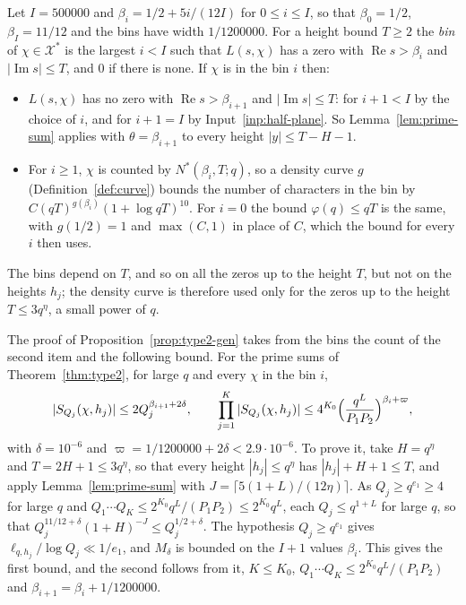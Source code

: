 \documentclass[11pt]{article}
\theoremstyle{definition}
\begin{document}
Let $I = 500000$ and $\beta_i = 1/2 + 5i/(12I)$ for $0 \le i \le I$, so that $\beta_0 = 1/2$, $\beta_I = 11/12$ and
the bins have width $1/1200000$. For a height bound $T \ge 2$ the \emph{bin} of $\chi \in \mathcal X^*$ is the largest
$i < I$ such that $L(s, \chi)$ has a zero with $\operatorname{Re} s > \beta_i$ and $|\operatorname{Im} s| \le T$, and
$0$ if there is none. If $\chi$ is in the bin $i$ then:
\begin{itemize}
\item $L(s, \chi)$ has no zero with $\operatorname{Re} s > \beta_{i+1}$ and $|\operatorname{Im} s| \le T$: for
  $i + 1 < I$ by the choice of $i$, and for $i + 1 = I$ by Input~\ref{inp:half-plane}. So
  Lemma~\ref{lem:prime-sum} applies with $\theta = \beta_{i+1}$ to every height $|y| \le T - H - 1$.
\item For $i \ge 1$, $\chi$ is counted by $N^*(\beta_i, T; q)$, so a density curve $g$ (Definition~\ref{def:curve})
bounds the number of characters
  in the bin by $C(qT)^{g(\beta_i)}(1 + \log qT)^{10}$. For $i = 0$ the bound $\varphi(q) \le qT$ is the same, with
  $g(1/2) = 1$ and $\max(C, 1)$ in place of $C$, which the bound for every $i$ then uses.
\end{itemize}
The bins depend on $T$, and so on all the zeros up to the height $T$, but not on the heights $h_j$; the density curve is
therefore used only for the zeros up to the height $T \le 3q^\eta$, a small power of $q$.

The proof of Proposition~\ref{prop:type2-gen} takes from the bins the count of the second item and the following
bound. For the prime sums of Theorem~\ref{thm:type2}, for large $q$ and every $\chi$ in the bin $i$,
\[
  |S_{Q_j}(\chi, h_j)| \le 2 Q_j^{\beta_{i+1} + 2\delta}, \qquad
  \prod_{j=1}^K |S_{Q_j}(\chi, h_j)| \le 4^{K_0} \Bigl(\frac{q^L}{P_1P_2}\Bigr)^{\beta_i + \varpi},
\]
with $\delta = 10^{-6}$ and $\varpi = 1/1200000 + 2\delta < 2.9 \cdot 10^{-6}$. To prove it, take $H = q^\eta$ and
$T = 2H + 1 \le 3q^\eta$, so that every height $|h_j| \le q^\eta$ has $|h_j| + H + 1 \le T$, and apply
Lemma~\ref{lem:prime-sum} with $J = \lceil 5(1 + L)/(12\eta) \rceil$. As
$Q_j \ge q^{e_1} \ge 4$ for large $q$ and $Q_1 \cdots Q_K \le 2^{K_0} q^L/(P_1P_2) \le 2^{K_0} q^L$, each $Q_j \le
q^{1 + L}$ for large $q$, so that $Q_j^{11/12 + \delta}(1 + H)^{-J} \le Q_j^{1/2 + \delta}$. The hypothesis $Q_j \ge
q^{e_1}$ gives $\ell_{q, h_j}/\log Q_j \ll 1/e_1$, and $M_\delta$ is bounded on the $I + 1$ values $\beta_i$. This
gives the first bound, and the second follows from it, $K \le K_0$, $Q_1 \cdots Q_K \le 2^{K_0} q^L/(P_1P_2)$ and
$\beta_{i+1} = \beta_i + 1/1200000$.
\end{document}
